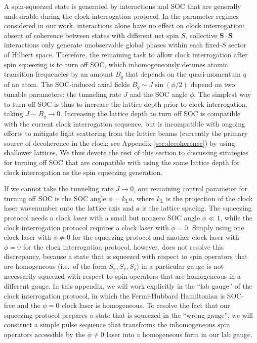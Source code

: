 \documentclass[aps,prx,superscriptaddress,notitlepage,twocolumn,longbibliography]{revtex4-2}
\renewcommand{\t}{\text} %
\renewcommand{\c}{\cdot} %
\renewcommand{\v}{\bm} %
\newcommand{\z}{\text{z}}
\newcommand{\x}{\text{x}}
\newcommand{\y}{\text{y}}
\begin{document}
A spin-squeezed state is generated by interactions and SOC that are generally undesirable during the clock interrogation protocol.
In the parameter regimes considered in our work, interactions alone have no effect on clock interrogation: absent of coherence between states with different net spin $S$, collective $\v S\c\v S$ interactions only generate unobservable global phases within each fixed-$S$ sector of Hilbert space.
Therefore, the remaining task to allow clock interrogation after spin squeezing is to turn off SOC, which inhomogeneously detunes atomic transition frequencies by an amount $B_q$ that depends on the quasi-momentum $q$ of an atom.
The SOC-induced axial fields $B_q\sim J\sin(\phi/2)$ depend on two tunable parameters: the tunneling rate $J$ and the SOC angle $\phi$.
The simplest way to turn off SOC is thus to increase the lattice depth prior to clock interrogation, taking $J\sim B_q\to0$.
Increasing the lattice depth to turn off SOC is compatible with the current clock interrogation sequence, but is incompatible with ongoing efforts to mitigate light scattering from the lattice beams (currently the primary source of decoherence in the clock; see Appendix \ref{sec:decoherence}) by using shallower lattices\cite{hutson2019engineering}.
We thus devote the rest of this section to discussing strategies for turning off SOC that are compatible with using the same lattice depth for clock interrogation as the spin squeezing generation.

If we cannot take the tunneling rate $J\to0$, our remaining control parameter for turning off SOC is the SOC angle $\phi=k_{\t{L}}a$, where $k_{\t{L}}$ is the projection of the clock laser wavenumber onto the lattice axis and $a$ is the lattice spacing.
The squeezing protocol needs a clock laser with a small but nonzero SOC angle $\phi\ll1$, while the clock interrogation protocol requires a clock laser with $\phi=0$.
Simply using one clock laser with $\phi\ne0$ for the squeezing protocol and another clock laser with $\phi=0$ for the clock interrogation protocol, however, does not resolve this discrepancy, because a state that is squeezed with respect to spin operators that are homogeneous (i.e.~of the form $S_\x,S_\y,S_\z$) in a particular gauge is not necessarily squeezed with respect to spin operators that are homogeneous in a different gauge.
In this appendix, we will work explicitly in the ``lab gauge'' of the clock interrogation protocol, in which the Fermi-Hubbard Hamiltonian is SOC-free and the $\phi=0$ clock laser is homogeneous.
To resolve the fact that our squeezing protocol prepares a state that is squeezed in the ``wrong gauge'', we will construct a simple pulse sequence that transforms the inhomogeneous spin operators accessible by the $\phi\ne0$ laser into a homogeneous form in our lab gauge.
\end{document}
